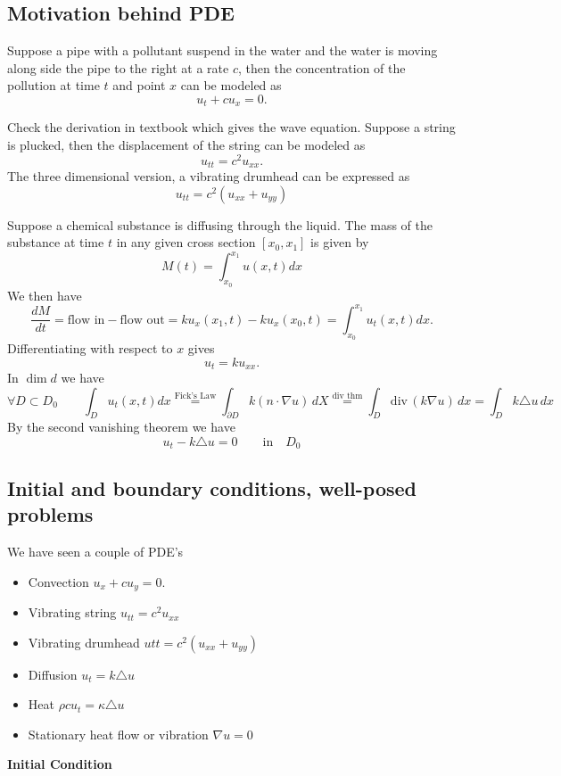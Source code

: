 \subsection{Motivation behind PDE}
\begin{example}[Transport]
	Suppose a pipe with a pollutant suspend in the water and the water is moving along side the pipe to the right at a rate $c$, then the concentration of the pollution at time $t$ and point $x$ can be modeled as
	\[ u_t  + c u_x = 0.\]
\end{example}
\begin{example}
	Check the derivation in textbook which gives the wave equation. Suppose a string is plucked, then the displacement of the string can be modeled as
	\[ u_{tt} = c^2 u_{xx}.\]
	The three dimensional version, a vibrating drumhead can be expressed as
	\[ u_{tt} = c^2 \left( u_{xx} + u_{yy} \right) \]
\end{example}
\begin{example}[Diffusion]
	Suppose a chemical substance is diffusing through the liquid. The mass of the substance at time $t$ in any given cross section $[x_0,x_1]$ is given by
	\[ M(t) = \int_{x_0}^{x_1} u(x,t) dx\]
	We then have
	\[ \frac{dM}{dt} = \text{flow in} - \text{flow out} = ku_x(x_1,t) - ku_x(x_0,t) = \int_{x_0}^{x_1} u_t(x,t) dx.\]
	Differentiating with respect to $x$ gives
	\[u_t = k u_{xx}.\]
	In $\dim d$ we have 
	\[ \forall D \subset D_0 \qquad \int_D u_t(x,t) dx \stackrel{\text{Fick's Law}}{=} \int_{\partial D} k(n \cdot \nabla u) \, dX \stackrel{\text{div thm}}{=} \int_{D} \mathrm{div}\,(k\nabla u)\, dx = \int_D k \triangle u\, dx\]
	By the second vanishing theorem we have
	\[ u_t - k \triangle u = 0 \qquad \mathrm{in} \quad D_0\]
\end{example}
\subsection{Initial and boundary conditions, well-posed problems}
We have seen a couple of PDE's
\begin{itemize}
	\item Convection $u_{x} + c u_{y} = 0$.
	\item Vibrating string $u_{tt} = c^2 u_{xx}$
	\item Vibrating drumhead $utt = c^2 \left( u_{xx}  + u_{yy} \right) $
	\item Diffusion $u_t = k \triangle u$
	\item Heat $\rho c u_{t}  = \kappa \triangle u$
	\item Stationary heat flow or vibration $\nabla u = 0$
\end{itemize}
 \textbf{Initial Condition} 


